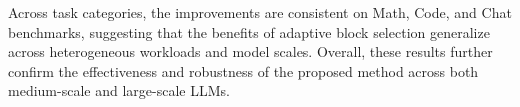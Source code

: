\documentclass{article}
\begin{document}
Across task categories, the improvements are consistent on Math, Code, and Chat benchmarks, suggesting that the benefits of adaptive block selection generalize across heterogeneous workloads and model scales. Overall, these results further confirm the effectiveness and robustness of the proposed method across both medium-scale and large-scale LLMs.

\end{document}
